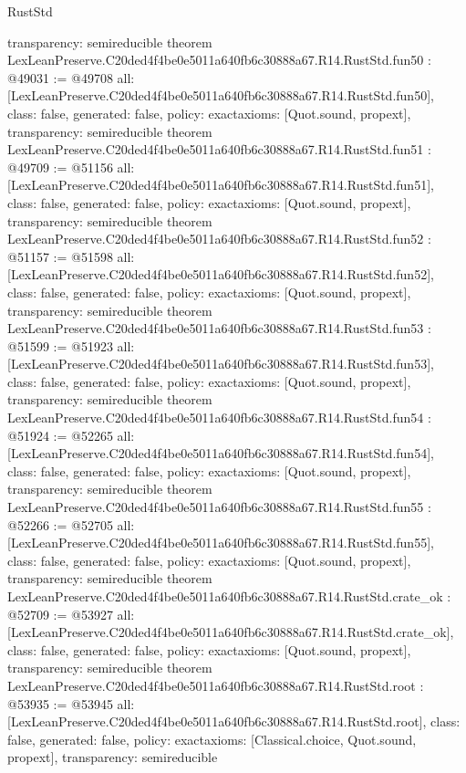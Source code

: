 \begin{lexlean}{RustStd}
\begin{coremodule}
{  transparency: semireducible
}
theorem LexLeanPreserve.C20ded4f4be0e5011a640fb6c30888a67.R14.RustStd.fun50 : @49031 := @49708 {
  all: [LexLeanPreserve.C20ded4f4be0e5011a640fb6c30888a67.R14.RustStd.fun50],
  class: false,
  generated: false,
  policy: exact{axioms: [Quot.sound, propext]},
  transparency: semireducible
}
theorem LexLeanPreserve.C20ded4f4be0e5011a640fb6c30888a67.R14.RustStd.fun51 : @49709 := @51156 {
  all: [LexLeanPreserve.C20ded4f4be0e5011a640fb6c30888a67.R14.RustStd.fun51],
  class: false,
  generated: false,
  policy: exact{axioms: [Quot.sound, propext]},
  transparency: semireducible
}
theorem LexLeanPreserve.C20ded4f4be0e5011a640fb6c30888a67.R14.RustStd.fun52 : @51157 := @51598 {
  all: [LexLeanPreserve.C20ded4f4be0e5011a640fb6c30888a67.R14.RustStd.fun52],
  class: false,
  generated: false,
  policy: exact{axioms: [Quot.sound, propext]},
  transparency: semireducible
}
theorem LexLeanPreserve.C20ded4f4be0e5011a640fb6c30888a67.R14.RustStd.fun53 : @51599 := @51923 {
  all: [LexLeanPreserve.C20ded4f4be0e5011a640fb6c30888a67.R14.RustStd.fun53],
  class: false,
  generated: false,
  policy: exact{axioms: [Quot.sound, propext]},
  transparency: semireducible
}
theorem LexLeanPreserve.C20ded4f4be0e5011a640fb6c30888a67.R14.RustStd.fun54 : @51924 := @52265 {
  all: [LexLeanPreserve.C20ded4f4be0e5011a640fb6c30888a67.R14.RustStd.fun54],
  class: false,
  generated: false,
  policy: exact{axioms: [Quot.sound, propext]},
  transparency: semireducible
}
theorem LexLeanPreserve.C20ded4f4be0e5011a640fb6c30888a67.R14.RustStd.fun55 : @52266 := @52705 {
  all: [LexLeanPreserve.C20ded4f4be0e5011a640fb6c30888a67.R14.RustStd.fun55],
  class: false,
  generated: false,
  policy: exact{axioms: [Quot.sound, propext]},
  transparency: semireducible
}
theorem LexLeanPreserve.C20ded4f4be0e5011a640fb6c30888a67.R14.RustStd.crate_ok : @52709 := @53927 {
  all: [LexLeanPreserve.C20ded4f4be0e5011a640fb6c30888a67.R14.RustStd.crate_ok],
  class: false,
  generated: false,
  policy: exact{axioms: [Quot.sound, propext]},
  transparency: semireducible
}
theorem LexLeanPreserve.C20ded4f4be0e5011a640fb6c30888a67.R14.RustStd.root : @53935 := @53945 {
  all: [LexLeanPreserve.C20ded4f4be0e5011a640fb6c30888a67.R14.RustStd.root],
  class: false,
  generated: false,
  policy: exact{axioms: [Classical.choice, Quot.sound, propext]},
  transparency: semireducible
}


\end{coremodule}
\end{lexlean}
